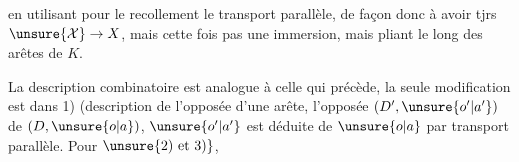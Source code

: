en utilisant pour le recollement le
transport parallèle, de façon donc
à avoir tjrs $\unsure{\mathcal X}\to X$, mais
cette fois pas une immersion,
mais   pliant
le long des arêtes de $K$.

La description combinatoire
est analogue à celle qui
précède, la seule modification
est dans 1) (description de
l'opposée d'une arête,  
l'opposée $(D',\unsure{o'|a'})$ de $(D,\unsure{o|a})$, $\unsure{o'|a'}$ est
déduite de $\unsure{o|a}$ par transport
parallèle. Pour $\unsure{2)\ \text{et}\ 3)}$, 
